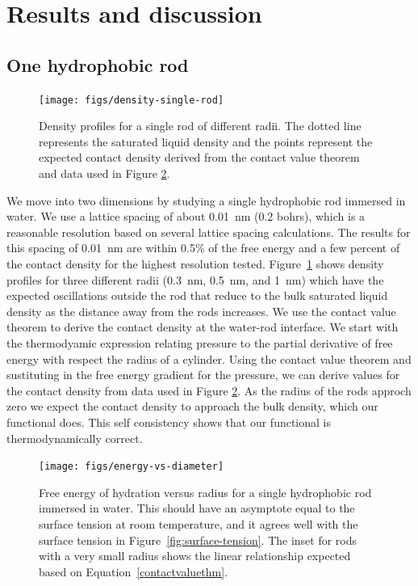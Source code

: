 \documentclass[letterpaper,twocolumn,amsmath,amssymb,prb]{revtex4-1}
\begin{document}
\section{Results and discussion}

\subsection{One hydrophobic rod}

\begin{figure}
\begin{center}
\texttt{[image: figs/density-single-rod]}
\end{center}
\caption{ Density profiles for a single rod of different radii. The dotted line
represents the saturated liquid density and the points represent the
expected contact density derived from the contact value theorem and
data used in Figure \ref{fig:energy-vs-diameter}.}
\label{fig:density-single-rod}
\end{figure}

We move into two dimensions by studying a single hydrophobic rod
immersed in water. We use a lattice spacing of about 0.01~nm (0.2 bohrs), 
which is a reasonable resolution based on several lattice spacing calculations.
The results for this spacing of 0.01~nm are within 0.5\% of the free energy 
and a few percent of the contact
density for the highest resolution tested.
Figure~\ref{fig:density-single-rod} shows density
profiles for three different radii (0.3~nm, 0.5~nm, and 1~nm) which have the
expected oscillations outside the rod that reduce to the bulk saturated liquid
density as the distance away from the rods increases. We use the
contact value theorem to derive the contact density at the water-rod
interface.  We start with the thermodyamic expression relating
pressure to the partial derivative of free energy with respect the
radius of a cylinder. Using the contact value theorem and sustituting in
the free energy gradient for the pressure, we can derive values for
the contact density from data used in Figure
\ref{fig:energy-vs-diameter}.  As the radius of the rods approch zero we
expect the contact density to approach the bulk density, which our
functional does.  This self consistency shows that our functional is
thermodynamically correct.

\begin{figure}
\begin{center}
\texttt{[image: figs/energy-vs-diameter]}
\end{center}
\caption{ Free energy of hydration versus radius for a single hydrophobic rod
immersed in water. This should have an asymptote equal to the surface
tension at room temperature, and it agrees well with the surface tension in
Figure~\ref{fig:surface-tension}. The inset for rods with a very small 
radius shows the linear relationship expected based on 
Equation~\ref{contactvaluethm}.}
\label{fig:energy-vs-diameter}
\end{figure}
\end{document}
